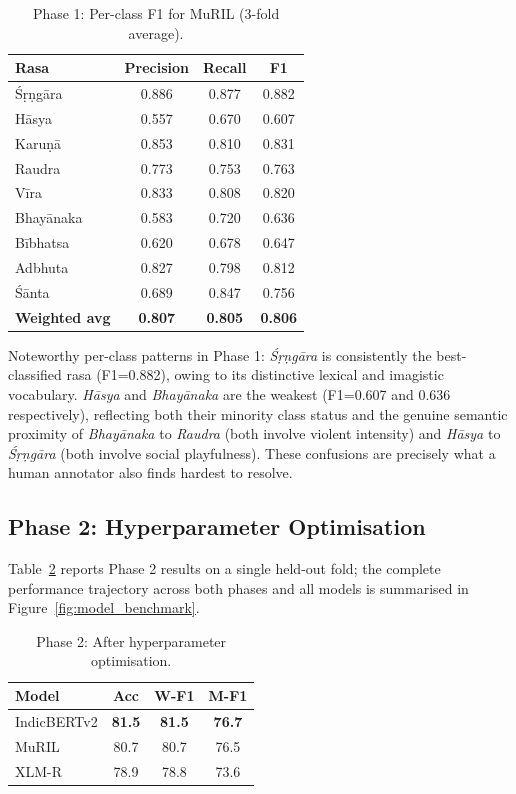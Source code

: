 \documentclass[11pt]{article}
\begin{document}
\begin{table}[htbp]
\centering
\small
\caption{Phase 1: Per-class F1 for MuRIL (3-fold average).}
\label{tab:muril_perclass_p1}
\begin{tabular}{lccc}
\toprule
Rasa & Precision & Recall & F1 \\
\midrule
Ś\d r\d ng\=ara & 0.886 & 0.877 & 0.882 \\
H\=asya         & 0.557 & 0.670 & 0.607 \\
Karu\d n\=a     & 0.853 & 0.810 & 0.831 \\
Raudra          & 0.773 & 0.753 & 0.763 \\
V\=ira          & 0.833 & 0.808 & 0.820 \\
Bhay\=anaka   & 0.583 & 0.720 & 0.636 \\
B\=ibhatsa      & 0.620 & 0.678 & 0.647 \\
Adbhuta         & 0.827 & 0.798 & 0.812 \\
Ś\=anta         & 0.689 & 0.847 & 0.756 \\
\midrule
\textbf{Weighted avg} & \textbf{0.807} & \textbf{0.805} & \textbf{0.806} \\
\bottomrule
\end{tabular}
\end{table}

Noteworthy per-class patterns in Phase 1: \textit{Ś\d r\d ng\=ara} is consistently the best-classified rasa (F1=0.882), owing to its distinctive lexical and imagistic vocabulary. \textit{H\=asya} and \textit{Bhay\=anaka} are the weakest (F1=0.607 and 0.636 respectively), reflecting both their minority class status and the genuine semantic proximity of \textit{Bhay\=anaka} to \textit{Raudra} (both involve violent intensity) and \textit{H\=asya} to \textit{Ś\d r\d ng\=ara} (both involve social playfulness). These confusions are precisely what a human annotator also finds hardest to resolve.

\subsection{Phase 2: Hyperparameter Optimisation}

Table~\ref{tab:phase2_results} reports Phase 2 results on a single held-out fold; the complete performance trajectory across both phases and all models is summarised in Figure~\ref{fig:model_benchmark}.

\begin{table}[htbp]
\centering
\small
\caption{Phase 2: After hyperparameter optimisation.}
\label{tab:phase2_results}
\begin{tabular}{@{}lccc@{}}
\toprule
Model & Acc & W-F1 & M-F1 \\
\midrule
IndicBERTv2 & \textbf{81.5} & \textbf{81.5} & \textbf{76.7} \\
MuRIL       & 80.7          & 80.7          & 76.5          \\
XLM-R       & 78.9          & 78.8          & 73.6          \\
\bottomrule
\end{tabular}
\end{table}
\end{document}
